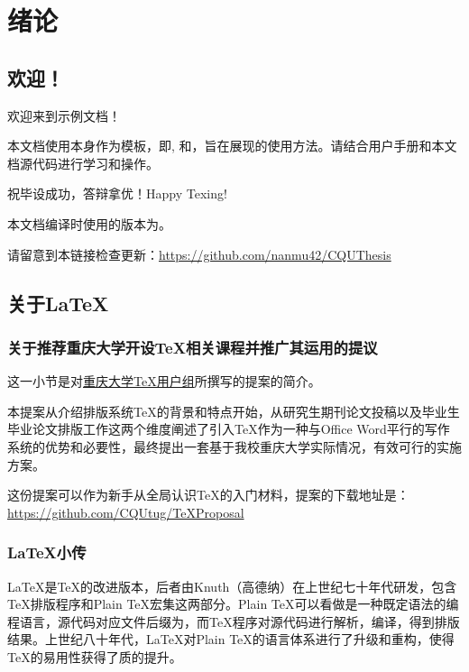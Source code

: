 \chapter{绪论}
\section{欢迎！}
欢迎来到\cquthesis{}示例文档！

本文档使用\cquthesis{}本身作为模板，即, 和，旨在展现\cquthesis{}的使用方法。请结合\cquthesis{}用户手册和本文档源代码进行学习和操作。

祝毕设成功，答辩拿优！Happy Texing!

本文档编译时使用的\cquthesis{}版本为\version{}。

请留意到本链接检查更新：\url{https://github.com/nanmu42/CQUThesis}

\section{关于\LaTeX{}}

\subsection{关于推荐重庆大学开设\TeX 相关课程并推广其运用的提议}
这一小节是对\href{http://jq.qq.com/?_wv=1027&k=2HvYu95}{重庆大学\TeX 用户组}所撰写的提案的简介。

本提案从介绍排版系统\TeX 的背景和特点开始，从研究生期刊论文投稿以及毕业生毕业论文排版工作这两个维度阐述了引入\TeX 作为一种与Office Word平行的写作系统的优势和必要性，最终提出一套基于我校重庆大学实际情况，有效可行的实施方案。

这份提案可以作为新手从全局认识\TeX 的入门材料，提案的下载地址是：\url{https://github.com/CQUtug/TeXProposal}

\subsection{\LaTeX{}小传}
\LaTeX{}是\TeX{}的改进版本，后者由Knuth（高德纳）在上世纪七十年代研发，包含\TeX{}排版程序和Plain \TeX{}宏集这两部分。Plain \TeX{}可以看做是一种既定语法的编程语言，源代码对应文件后缀为，而\TeX{}程序对源代码进行解析，编译，得到排版结果。上世纪八十年代，\LaTeX{}对Plain \TeX{}的语言体系进行了升级和重构，使得\TeX{}的易用性获得了质的提升。

